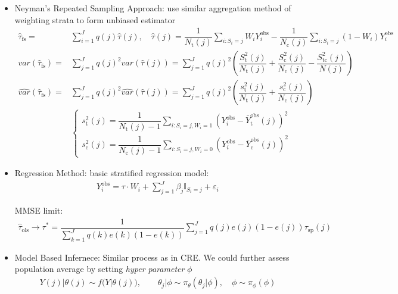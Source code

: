 \begin{itemize}[topsep=2pt,itemsep=0pt]
    
    \item Neyman's Repeated Sampling Approach: use similar aggregation method of weighting strata to form unbiased estimator
    \begin{align}\label{EqaNeymanEstimatorStratified}
        \hat{\tau}_\mathrm{fs}=&\sum_{i=1}^Jq(j)\hat{\tau}(j),\quad \hat{\tau}(j)=\dfrac{1}{N_\mathrm{t}(j) }\sum_{i:S_i=j}W_iY_i^\mathrm{obs}- \dfrac{1}{N_\mathrm{c}(j) }\sum_{i:S_i=j}(1-W_i)Y_i^\mathrm{obs}\\
        var(\hat{\tau}_\mathrm{fs} )=&\sum_{j=1}^Jq(j)^2var\left(\hat{\tau}(j)\right)=\sum_{j=1}^J q(j)^2\left(\dfrac{S_\mathrm{t}^2(j) }{N_\mathrm{t}(j) }+\dfrac{S_\mathrm{c}^2(j) }{N_\mathrm{c}(j) }-\dfrac{S_\mathrm{tc}^2(j) }{N(j) }\right)\\
        \hat{var}(\hat{\tau}_\mathrm{fs} )=&\sum_{j=1}^Jq(j)^2\hat{var}\left(\hat{\tau}(j)\right)=\sum_{j=1}^J q(j)^2\left(\dfrac{s_\mathrm{t}^2(j) }{N_\mathrm{t}(j) }+\dfrac{s_\mathrm{c}^2(j) }{N_\mathrm{c}(j) }\right)\\
        &\begin{cases}
        s_\mathrm{t}^2(j)=\dfrac{1}{N_\mathrm{t} (j)-1}\sum_{i:S_i=j,W_i=1}(Y_i^\mathrm{obs}-\bar{Y}^\mathrm{obs}_\mathrm{t}(j))^2 \\
        s_\mathrm{c}^2(j)=\dfrac{1}{N_\mathrm{c} (j)-1}\sum_{i:S_i=j,W_i=0}(Y_i^\mathrm{obs}-\bar{Y}^\mathrm{obs}_\mathrm{c}(j))^2 
        \end{cases}
    \end{align}

    \item Regression Method: basic stratified regression model:
    \begin{align}
        Y_i^\mathrm{obs}=\tau\cdot W_i + \sum_{j=1}^J\beta _j \mathbb{I}_{S_i=j}+\varepsilon _i 
    \end{align}

    MMSE limit:
    \begin{align}
        \hat{\tau}_\mathrm{ols}\to \tau^*= \dfrac{1}{\sum_{k=1}^J q(k)e(k)(1-e(k))} \sum_{j=1}^Jq(j)e(j)(1-e(j))\tau_\mathrm{sp}(j) 
    \end{align}
    
    \item Model Based Infernece: Similar process as in CRE. We could further assess population average by setting \textit{hyper parameter} $ \phi  $
    \begin{align}
        Y(j)|\theta (j)\sim f(Y|\theta(j)),\qquad  \theta _j|\phi  \sim \pi_\theta (\theta _j|\phi ),\quad \phi \sim \pi_\phi (\phi )
    \end{align}
\end{itemize}

